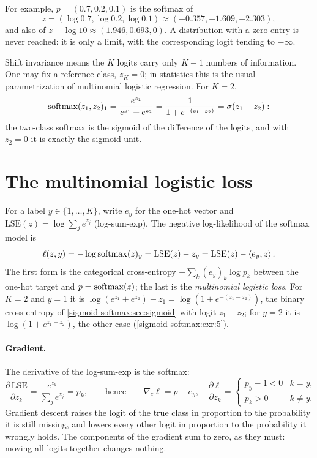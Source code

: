 \begin{notechapter}
For example, $p = (0.7, 0.2, 0.1)$ is the softmax of
\[
z = (\log0.7, \log0.2, \log0.1)\approx(-0.357, -1.609, -2.303),
\]
and also of $z + \log10\approx(1.946, 0.693, 0)$. A distribution
with a zero entry is never reached: it is only a limit, with the corresponding
logit tending to $-\infty$.

Shift invariance means the $K$ logits carry only $K - 1$ numbers of information.
One may fix a reference class, $z_K = 0$; in statistics this is the usual
parametrization of multinomial logistic regression. For $K = 2$,
\[
  \operatorname{softmax}(z_1, z_2)_1 = \frac{e^{z_1}}{e^{z_1} + e^{z_2}} = \frac1{1 + e^{-(z_1 - z_2)}} = \sigma(z_1 - z_2):
\]
the two-class softmax is the sigmoid of the difference of the logits, and with
$z_2 = 0$ it is exactly the sigmoid unit.

\section{The multinomial logistic loss}\label{sigmoid-softmax:sec:loss}

For a label $y\in\{1,\dots,K\}$, write $e_y$ for the one-hot vector and
$\mathrm{LSE}(z) = \log\sum_je^{z_j}$ (log-sum-exp). The negative log-likelihood of the softmax
model is
\begin{equation}\label{sigmoid-softmax:eq:loss}
  \ell(z, y) = -\log\operatorname{softmax}(z)_y = \mathrm{LSE}(z) - z_y = \mathrm{LSE}(z) - \left\langle e_y, z \right\rangle.
\end{equation}
The first form is the categorical cross-entropy $-\sum_k(e_y)_k\log p_k$ between the one-hot
target and $p = \operatorname{softmax}(z)$; the last is the \emph{multinomial logistic loss}. For
$K = 2$ and $y = 1$ it is $\log(e^{z_1} + e^{z_2}) - z_1 = \log(1 + e^{-(z_1 - z_2)})$, the binary
cross-entropy of \cref{sigmoid-softmax:sec:sigmoid} with logit $z_1 - z_2$; for $y = 2$ it is
$\log(1 + e^{z_1 - z_2})$, the other case (\cref{sigmoid-softmax:exr:5}).

\paragraph{Gradient.} The derivative of the log-sum-exp is the softmax:
\[
  \frac{\partial\,\mathrm{LSE}}{\partial z_k} = \frac{e^{z_k}}{\sum_je^{z_j}} = p_k,
  \qquad\text{hence}\qquad
  \nabla_z\ell = p - e_y,\quad
  \frac{\partial\ell}{\partial z_k} = \begin{cases}p_y - 1<0 & k = y,\\ p_k>0 & k\neq y.\end{cases}
\]
Gradient descent raises the logit of the true class in proportion to the
probability it is still missing, and lowers every other logit in proportion to the
probability it wrongly holds. The components of the gradient sum to zero, as they
must: moving all logits together changes nothing.


\end{notechapter}
